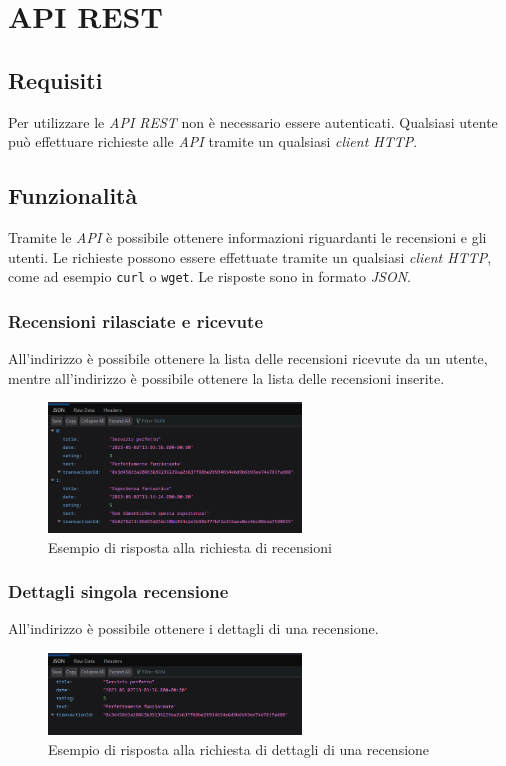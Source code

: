 \section{API REST}

\subsection{Requisiti}
Per utilizzare le \textit{API REST} non è necessario essere autenticati. Qualsiasi utente può effettuare richieste alle \textit{API} tramite un qualsiasi \textit{client HTTP}.

\subsection{Funzionalità}
Tramite le \textit{API} è possibile ottenere informazioni riguardanti le recensioni e gli utenti. Le richieste possono essere effettuate tramite un qualsiasi \textit{client HTTP}, come ad esempio \texttt{curl} o \texttt{wget}. Le risposte sono in formato \textit{JSON}\glo.

\subsubsection{Recensioni rilasciate e ricevute}
All'indirizzo  è possibile ottenere la lista delle recensioni ricevute da un utente, mentre all'indirizzo  è possibile ottenere la lista delle recensioni inserite.

\begin{figure}[H]
    \centering
    \includegraphics[width=0.6\textwidth]{src/img/api_reviews}
    \caption{Esempio di risposta alla richiesta di recensioni}\label{fig:api_reviews}
\end{figure}

\subsubsection{Dettagli singola recensione}
All'indirizzo  è possibile ottenere i dettagli di una recensione.

\begin{figure}[H]
    \centering
    \includegraphics[width=0.6\textwidth]{src/img/api_single_review}
    \caption{Esempio di risposta alla richiesta di dettagli di una recensione}
    \label{fig:api_single_review}
\end{figure}